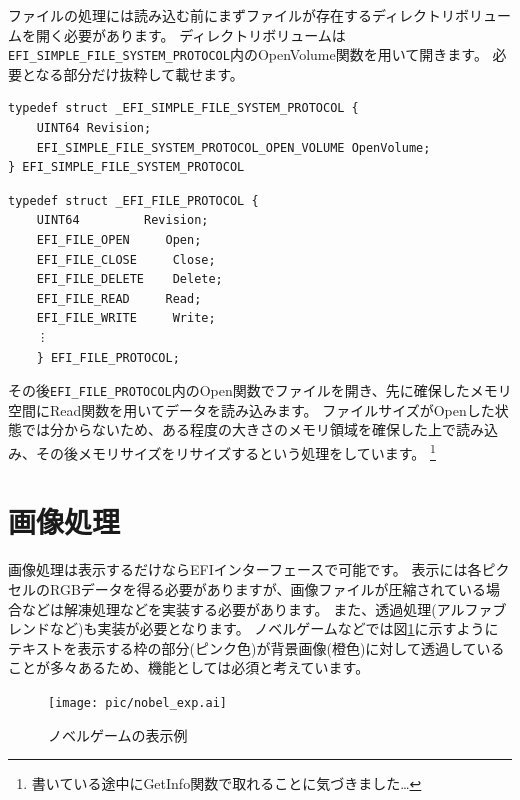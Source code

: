 \documentclass[10pt,b5paper,twoside,openany]{ltjsbook}
\begin{document}
ファイルの処理には読み込む前にまずファイルが存在するディレクトリボリュームを開く必要があります。
ディレクトリボリュームは\verb+EFI_SIMPLE_FILE_SYSTEM_PROTOCOL+内のOpenVolume関数を用いて開きます。
必要となる部分だけ抜粋して載せます。
\begin{lstlisting}[caption=EFI\_SIMPLE\_FILE\_SYSTEM\_PROTOCOL,label=efi_simple_file_system_protocol]
typedef struct _EFI_SIMPLE_FILE_SYSTEM_PROTOCOL {
    UINT64 Revision;
    EFI_SIMPLE_FILE_SYSTEM_PROTOCOL_OPEN_VOLUME OpenVolume;
} EFI_SIMPLE_FILE_SYSTEM_PROTOCOL
\end{lstlisting}
\begin{lstlisting}[caption=EFI\_FILE\_PROTOCOL,label=efi_file_protocol]
typedef struct _EFI_FILE_PROTOCOL {
    UINT64         Revision;
    EFI_FILE_OPEN     Open;
    EFI_FILE_CLOSE     Close;
    EFI_FILE_DELETE    Delete;
    EFI_FILE_READ     Read;
    EFI_FILE_WRITE     Write;
    ︙
    } EFI_FILE_PROTOCOL;
\end{lstlisting}    
その後\verb+EFI_FILE_PROTOCOL+内のOpen関数でファイルを開き、先に確保したメモリ空間にRead関数を用いてデータを読み込みます。
ファイルサイズがOpenした状態では分からないため、ある程度の大きさのメモリ領域を確保した上で読み込み、その後メモリサイズをリサイズするという処理をしています。
\footnote{書いている途中にGetInfo関数で取れることに気づきました…}

\section{画像処理}
画像処理は表示するだけならEFIインターフェースで可能です。
表示には各ピクセルのRGBデータを得る必要がありますが、画像ファイルが圧縮されている場合などは解凍処理などを実装する必要があります。
また、透過処理(アルファブレンドなど)も実装が必要となります。
ノベルゲームなどでは図\ref{fig:nobel_exp}に示すようにテキストを表示する枠の部分(ピンク色)が背景画像(橙色)に対して透過していることが多々あるため、機能としては必須と考えています。
\begin{figure}[H]
    \centering
    \texttt{[image: pic/nobel\_exp.ai]}
    \caption{ノベルゲームの表示例}
    \label{fig:nobel_exp}
\end{figure}
\end{document}

